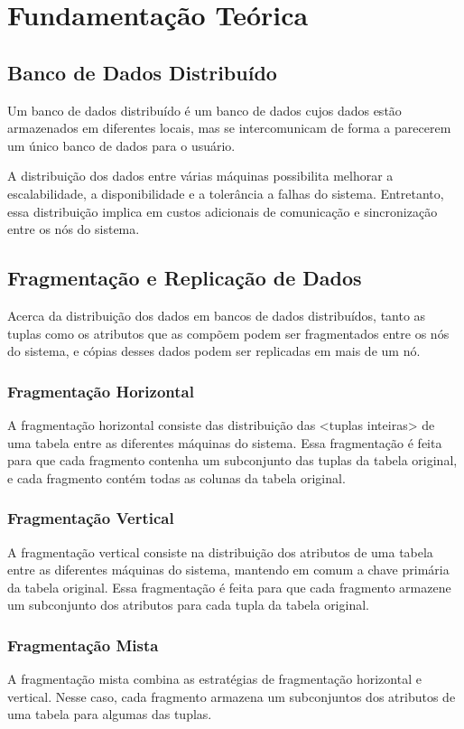\section{Fundamentação Teórica}
\subsection{Banco de Dados Distribuído}
Um banco de dados distribuído é um banco de dados cujos dados estão armazenados em diferentes locais, 
mas se intercomunicam de forma a parecerem um único banco de dados para o usuário.

A distribuição dos dados entre várias máquinas possibilita melhorar a escalabilidade,
a disponibilidade e a tolerância a falhas do sistema. Entretanto, essa distribuição 
implica em custos adicionais de comunicação e sincronização entre os nós do sistema.

\subsection{Fragmentação e Replicação de Dados}
Acerca da distribuição dos dados em bancos de dados distribuídos, 
tanto as tuplas como os atributos que as compõem podem ser fragmentados entre os nós do sistema,
e cópias desses dados podem ser replicadas em mais de um nó. 

\subsubsection{Fragmentação Horizontal}
A fragmentação horizontal consiste das distribuição das <tuplas inteiras> de uma tabela entre as diferentes máquinas do sistema.
Essa fragmentação é feita para que cada fragmento contenha um subconjunto das tuplas da tabela original,
e cada fragmento contém todas as colunas da tabela original.

\subsubsection{Fragmentação Vertical}
A fragmentação vertical consiste na distribuição dos atributos de uma tabela entre as diferentes máquinas do sistema, 
mantendo em comum a chave primária da tabela original.
Essa fragmentação é feita para que cada fragmento armazene um subconjunto dos atributos para cada tupla da tabela original.

\subsubsection{Fragmentação Mista}
A fragmentação mista combina as estratégias de fragmentação horizontal e vertical.
Nesse caso, cada fragmento armazena um subconjuntos dos atributos de uma tabela para algumas das tuplas.

